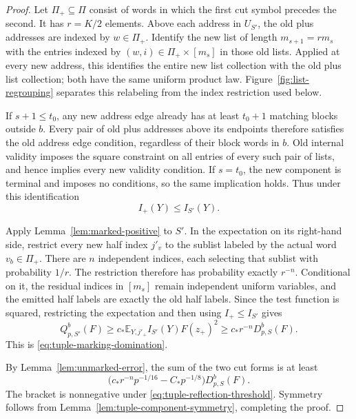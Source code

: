 \begin{proof}
Let \(\Pi_+\subseteq\Pi\) consist of words in which the first
cut symbol precedes the second.  It has \(r=K/2\) elements.
Above each address in \(U_{S'}\), the old plus addresses are
indexed by \(w\in\Pi_+\).  Identify the new list of length
\(m_{s+1}=rm_s\) with the entries indexed by
\((w,i)\in\Pi_+\times[m_s]\) in those old lists.  Applied at every
new address, this identifies the entire new list collection with
the old plus list collection; both have the same uniform product law.
Figure~\ref{fig:list-regrouping} separates this relabeling from the
index restriction used below.


If \(s+1\le t_0\), any new address edge already has at least
\(t_0+1\) matching blocks outside \(b\).  Every pair of old plus
addresses above its endpoints therefore satisfies the old address
edge condition, regardless of their block words in \(b\).
Old internal validity imposes the square constraint on all entries
of every such pair of lists, and hence implies every new validity
condition.  If \(s=t_0\), the new component is terminal and imposes
no conditions, so the same implication holds.  Thus under this
identification
\[
 I_+(Y)\le I_{S'}(Y).
\]

Apply Lemma~\ref{lem:marked-positive} to \(S'\).  In the expectation
on its right-hand side, restrict every new half index \(j'_v\) to
the sublist labeled by the actual word \(v_b\in\Pi_+\).
There are \(n\) independent indices, each selecting that sublist
with probability \(1/r\).  The restriction therefore has probability
exactly \(r^{-n}\).  Conditional on it, the residual indices in
\([m_s]\) remain independent uniform variables, and the emitted
half labels are exactly the old half labels.  Since the test function
is squared, restricting the expectation and then using
\(I_+\le I_{S'}\) gives
\[
 Q_{p,S'}^{b}(F)
 \ge c_*\mathbb E_{Y,j'_+}I_{S'}(Y)F(z_+)^2
 \ge c_*r^{-n}D_{p,S}^{b}(F).
\]
This is \eqref{eq:tuple-marking-domination}.

By Lemma~\ref{lem:unmarked-error}, the sum of the two cut forms is
at least
\[
 \bigl(c_*r^{-n}p^{-1/16}-C_*p^{-1/8}\bigr)D_{p,S}^{b}(F).
\]
The bracket is nonnegative under
\eqref{eq:tuple-reflection-threshold}.  Symmetry follows from
Lemma~\ref{lem:tuple-component-symmetry}, completing the proof.
\end{proof}

